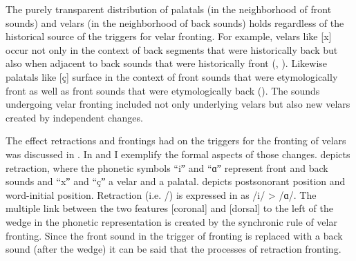 The purely transparent distribution of palatals (in the neighborhood of front sounds) and velars (in the neighborhood of back sounds) holds regardless of the historical source of the triggers for velar fronting. For example, velars like [x] occur not only in the context of back segments that were historically back but also when adjacent to back sounds that were historically front (, ). Likewise palatals like [ç] surface in the context of front sounds that were etymologically front as well as front sounds that were etymologically back (). The sounds undergoing velar fronting included not only underlying velars but also new velars created by independent changes.

The effect retractions and frontings had on the triggers for the fronting of velars was discussed in . In  and  I exemplify the formal aspects of those changes.  depicts retraction, where the phonetic symbols “iˮ and “ɑˮ represent front and back sounds and “xˮ and “çˮ a velar and a palatal.  depicts postsonorant position and  word-initial position. Retraction (i.e. /) is expressed in  as /i/ > /ɑ/. The multiple link between the two features [coronal] and [dorsal] to the left of the wedge in the phonetic representation is created by the synchronic rule of velar fronting. Since the front sound in the trigger of fronting is replaced with a back sound (after the wedge) it can be said that the processes of retraction  fronting.

